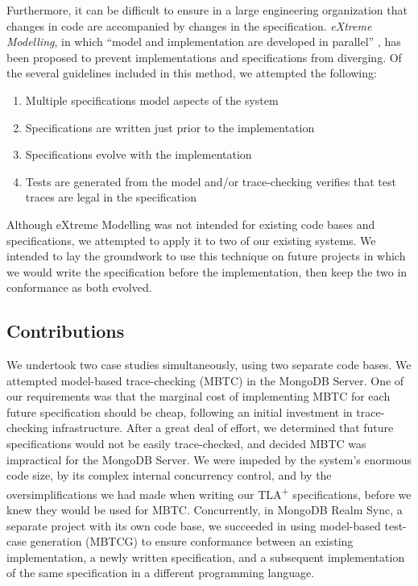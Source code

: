 \documentclass{vldb}
\begin{document}
Furthermore, it can be difficult to ensure in a large engineering organization that changes in code are accompanied by changes in the specification. \textit{eXtreme Modelling}, in which ``model and implementation are developed in parallel'' \cite{Gravell11ConcurrentDevelopmentOfModelAndImplementation}, has been proposed to prevent implementations and specifications from diverging.
Of the several guidelines included in this method, we attempted the following:
\begin{enumerate}[itemsep=-0.5ex]
  \item Multiple specifications model aspects of the system
  \item Specifications are written just prior to the implementation
  \item Specifications evolve with the implementation
  \item Tests are generated from the model and/or trace-checking verifies that test traces are legal in the specification
\end{enumerate}

Although eXtreme Modelling was not intended for existing code bases and specifications, we attempted to apply it to two of our existing systems. We intended to lay the groundwork to use this technique on future projects in which we would write the specification before the implementation, then keep the two in conformance as both evolved.

\subsection{Contributions}

We undertook two case studies simultaneously, using two separate code bases.
We attempted model-based trace-checking (MBTC) in the MongoDB Server.
One of our requirements was that the marginal cost of implementing MBTC for each future specification should be cheap, following an initial investment in trace-checking infrastructure.
After a great deal of effort, we determined that future specifications would not be easily trace-checked, and decided MBTC was impractical for the MongoDB Server.
We were impeded by the system's enormous code size, by its complex internal concurrency control, and by the oversimplifications we had made when writing our TLA\textsuperscript{+} specifications, before we knew they would be used for MBTC.
Concurrently, in MongoDB Realm Sync, a separate project with its own code base, we succeeded in using model-based test-case generation (MBTCG) to ensure conformance between an existing implementation, a newly written specification, and a subsequent implementation of the same specification in a different programming language.
\end{document}
